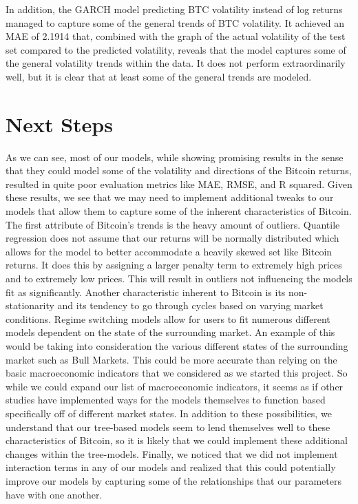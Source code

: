 \documentclass{article}
\begin{document}
In addition, the GARCH model predicting BTC volatility instead of log returns managed to capture some of the general trends of BTC volatility. It achieved an MAE of 2.1914 that, combined with the graph of the actual volatility of the test set compared to the predicted volatility, reveals that the model captures some of the general volatility trends within the data. It does not perform extraordinarily well, but it is clear that at least some of the general trends are modeled. 

\section{Next Steps}
As we can see, most of our models, while showing promising results in the sense that they could model some of the volatility and directions of the Bitcoin returns, resulted in quite poor evaluation metrics like MAE, RMSE, and R squared. Given these results, we see that we may need to implement additional tweaks to our models that allow them to capture some of the inherent characteristics of Bitcoin.\\

 The first attribute of Bitcoin’s trends is the heavy amount of outliers. Quantile regression does not assume that our returns will be normally distributed which allows for the model to better accommodate a heavily skewed set like Bitcoin returns. It does this by assigning a larger penalty term to extremely high prices and to extremely low prices. This will result in outliers not influencing the models fit as significantly. Another characteristic inherent to Bitcoin is its non-stationarity and its tendency to go through cycles based on varying market conditions. Regime switching models allow for users to fit numerous different models dependent on the state of the surrounding market. An example of this would be taking into consideration the various different states of the surrounding market such as Bull Markets. This could be more accurate than relying on the basic macroeconomic indicators that we considered as we started this project. So while we could expand our list of macroeconomic indicators, it seems as if other studies have implemented ways for the models themselves to function based specifically off of different market states. In addition to these possibilities, we understand that our tree-based models seem to lend themselves well to these characteristics of Bitcoin, so it is likely that we could implement these additional changes within the tree-models. Finally, we noticed that we did not implement interaction terms in any of our models and realized that this could potentially improve our models by capturing some of the relationships that our parameters have with one another. \\
 
\end{document}
